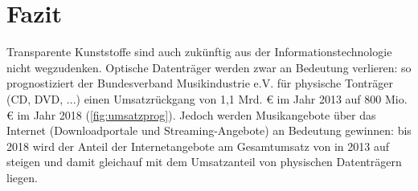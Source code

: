 \section{Fazit}
\label{sec:schluss}

Transparente Kunststoffe sind auch zukünftig aus der Informationstechnologie
nicht wegzudenken. Optische Datenträger werden zwar an Bedeutung verlieren: so
prognostiziert der Bundesverband Musikindustrie e.V. für physische Tonträger
(CD, DVD, ...) einen Umsatzrückgang von 1,1 Mrd. \euro{} im Jahr 2013 auf 800
Mio. \euro{} im Jahr 2018 (\autoref{fig:umsatzprog}). Jedoch werden
Musikangebote über das Internet (Downloadportale und Streaming-Angebote) an
Bedeutung gewinnen: bis 2018 wird der Anteil der Internetangebote am
Gesamtumsatz von  in 2013 auf  steigen und
damit gleichauf mit dem Umsatzanteil von physischen Datenträgern liegen.


